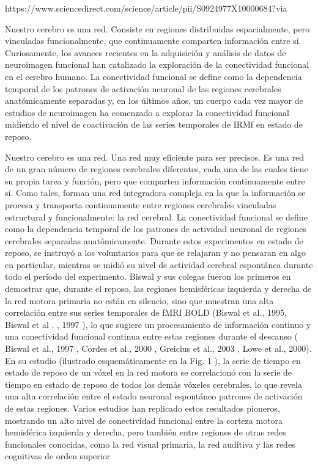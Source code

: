 https://www.sciencedirect.com/science/article/pii/S0924977X10000684?via%


Nuestro cerebro es una red. Consiste en regiones distribuidas espacialmente, pero vinculadas funcionalmente, que continuamente comparten información entre sí. Curiosamente, los avances recientes en la adquisición y análisis de datos de neuroimagen funcional han catalizado la exploración de la conectividad funcional en el cerebro humano. La conectividad funcional se define como la dependencia temporal de los patrones de activación neuronal de las regiones cerebrales anatómicamente separadas y, en los últimos años, un cuerpo cada vez mayor de estudios de neuroimagen ha comenzado a explorar la conectividad funcional midiendo el nivel de coactivación de las series temporales de IRMf en estado de reposo.

Nuestro cerebro es una red. Una red muy eficiente para ser precisos. Es una red de un gran número de regiones cerebrales diferentes, cada una de las cuales tiene su propia tarea y función, pero que comparten información continuamente entre sí. Como tales, forman una red integradora compleja en la que la información se procesa y transporta continuamente entre regiones cerebrales vinculadas estructural y funcionalmente: la red cerebral.  La conectividad funcional se define como la dependencia temporal de los patrones de actividad neuronal de regiones cerebrales separadas anatómicamente. Durante estos experimentos en estado de reposo, se instruyó a los voluntarios para que se relajaran y no pensaran en algo en particular, mientras se midió su nivel de actividad cerebral espontánea durante todo el período del experimento. Biswal y sus colegas fueron los primeros en demostrar que, durante el reposo, las regiones hemisféricas izquierda y derecha de la red motora primaria no están en silencio, sino que muestran una alta correlación entre sus series temporales de fMRI BOLD (Biswal et al., 1995, Biswal et al . , 1997 ), lo que sugiere un procesamiento de información continuo y una conectividad funcional continua entre estas regiones durante el descanso ( Biswal et al., 1997 , Cordes et al., 2000 , Greicius et al., 2003 , Lowe et al., 2000). En su estudio (ilustrado esquemáticamente en la Fig. 1 ), la serie de tiempo en estado de reposo de un vóxel en la red motora se correlacionó con la serie de tiempo en estado de reposo de todos los demás vóxeles cerebrales, lo que revela una alta correlación entre el estado neuronal espontáneo patrones de activación de estas regiones. Varios estudios han replicado estos resultados pioneros, mostrando un alto nivel de conectividad funcional entre la corteza motora hemisférica izquierda y derecha, pero también entre regiones de otras redes funcionales conocidas, como la red visual primaria, la red auditiva y las redes cognitivas de orden superior

